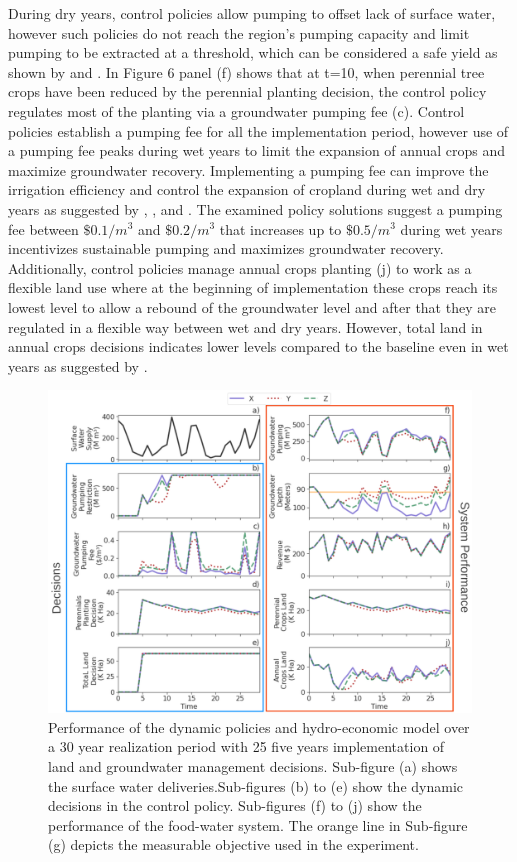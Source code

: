 \documentclass[11pt,a4paper]{article}
\begin{document}
During dry years, control policies allow pumping to offset lack of surface water, however such policies do not reach the region’s pumping capacity and limit pumping to be extracted at a threshold, which can be considered a safe yield as shown by \textcite{miro_framework_2019} and \cite{macewan_hydroeconomic_2017}. In Figure 6 panel (f) shows that at t=10, when perennial tree crops have been reduced by the perennial planting decision, the control policy regulates most of the planting via a groundwater pumping fee (c). Control policies establish a pumping fee for all the implementation period, however use of a pumping fee peaks during wet years to limit the expansion of annual crops and maximize groundwater recovery. Implementing a pumping fee can improve the irrigation efficiency and control the expansion of cropland during wet and dry years as suggested by \textcite{stone_economic_2022}, \textcite{graveline_combining_2020}, and \textcite{khan_effect_2019}. The examined policy solutions suggest a pumping fee between $\$0.1/m^{3}$ and $\$0.2/m^{3}$ that increases up to $\$0.5/m^{3}$ during wet years incentivizes sustainable pumping and maximizes groundwater recovery. Additionally, control policies manage annual crops planting (j) to work as a flexible land use where at the beginning of implementation these crops reach its lowest level to allow a rebound of the groundwater level and after that they are regulated in a flexible way between wet and dry years. However, total land in annual crops decisions indicates lower levels compared to the baseline even in wet years as suggested by \textcite{hanak_water_2019}. 

\begin{figure}[H]
    \centering
    \includegraphics[width=1\textwidth]{selected_policies_performance_labels.png}
    \caption{Performance of the dynamic policies and hydro-economic model over a 30 year realization period with 25 five years implementation of land and groundwater management decisions. Sub-figure (a) shows the surface water deliveries.Sub-figures (b) to (e) show the dynamic decisions in the control policy. Sub-figures (f) to (j) show the performance of the food-water system. The orange line in Sub-figure (g) depicts the measurable objective used in the experiment.} \label{fig:parallel_robustness}
\end{figure}
\end{document}
